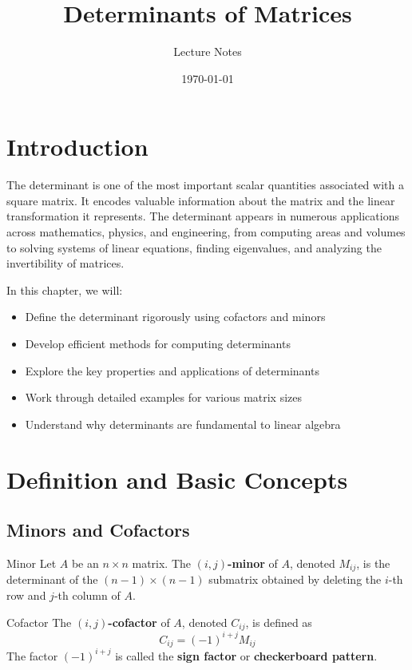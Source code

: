 \documentclass[12pt,a4paper]{article}
\title{\textbf{Determinants of Matrices}}
\author{Lecture Notes}
\date{\today}
\begin{document}
	
	\maketitle
	
	\tableofcontents
	
	\newpage
	
	\section{Introduction}
	
	The determinant is one of the most important scalar quantities associated with a square matrix. It encodes valuable information about the matrix and the linear transformation it represents. The determinant appears in numerous applications across mathematics, physics, and engineering, from computing areas and volumes to solving systems of linear equations, finding eigenvalues, and analyzing the invertibility of matrices.
	
	In this chapter, we will:
	\begin{itemize}
		\item Define the determinant rigorously using cofactors and minors
		\item Develop efficient methods for computing determinants
		\item Explore the key properties and applications of determinants
		\item Work through detailed examples for various matrix sizes
		\item Understand why determinants are fundamental to linear algebra
	\end{itemize}
	
	\section{Definition and Basic Concepts}
	
	\subsection{Minors and Cofactors}
	
	\begin{definition}{Minor}
		Let $A$ be an $n \times n$ matrix. The \textbf{$(i,j)$-minor} of $A$, denoted $M_{ij}$, is the determinant of the $(n-1) \times (n-1)$ submatrix obtained by deleting the $i$-th row and $j$-th column of $A$.
	\end{definition}
	
	\begin{definition}{Cofactor}
		The \textbf{$(i,j)$-cofactor} of $A$, denoted $C_{ij}$, is defined as
		\[
		C_{ij} = (-1)^{i+j} M_{ij}
		\]
		The factor $(-1)^{i+j}$ is called the \textbf{sign factor} or \textbf{checkerboard pattern}.
	\end{definition}
	
\end{document}
